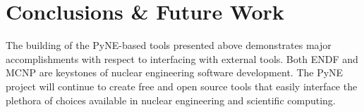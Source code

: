 \documentclass{anstrans}
\begin{document}
\section{Conclusions \& Future Work}
\label{sec:conc}

The building of the PyNE-based tools presented above demonstrates major 
accomplishments with respect
to interfacing with external tools.  Both ENDF and MCNP are keystones of 
nuclear engineering software development.  The PyNE project will continue to create 
free and open source tools that easily interface the plethora of choices available 
in nuclear engineering and scientific computing. 



\end{document}
